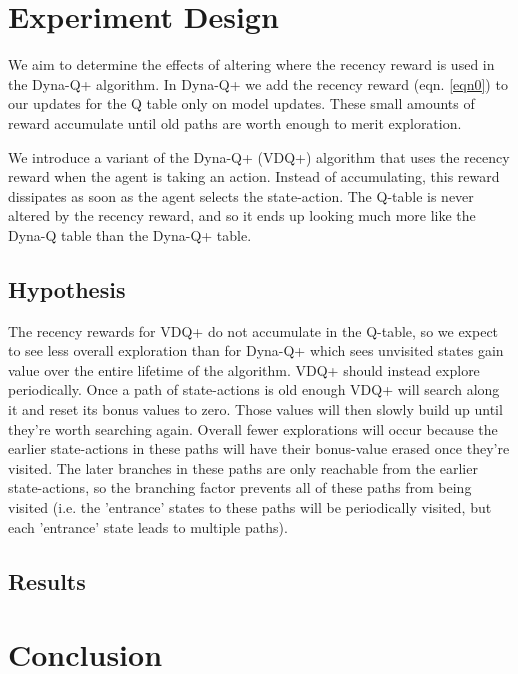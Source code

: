 \section{Experiment Design}

We aim to determine the effects of altering where the recency reward is used in the Dyna-Q+ algorithm. In Dyna-Q+ we add the recency reward (eqn. \ref{eqn0}) to our updates for the Q table only on model updates. These small amounts of reward accumulate until old paths are worth enough to merit exploration. 

We introduce a variant of the Dyna-Q+ (VDQ+) algorithm that uses the recency reward when the agent is taking an action. Instead of accumulating, this reward dissipates as soon as the agent selects the state-action. The Q-table is never altered by the recency reward, and so it ends up looking much more like the Dyna-Q table than the Dyna-Q+ table. 

\subsection{Hypothesis}

The recency rewards for VDQ+ do not accumulate in the Q-table, so we expect to see less overall exploration than for Dyna-Q+ which sees unvisited states gain value over the entire lifetime of the algorithm. VDQ+ should instead explore periodically. Once a path of state-actions is old enough VDQ+ will search along it and reset its bonus values to zero. Those values will then slowly build up until they're worth searching again. Overall fewer explorations will occur because the earlier state-actions in these paths will have their bonus-value erased once they're visited. The later branches in these paths are only reachable from the earlier state-actions, so the branching factor prevents all of these paths from being visited (i.e. the 'entrance' states to these paths will be periodically visited, but each 'entrance' state leads to multiple paths). 


\subsection{Results}

\section{Conclusion}

